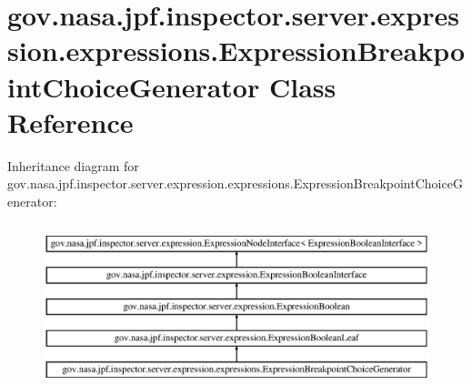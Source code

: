 \hypertarget{classgov_1_1nasa_1_1jpf_1_1inspector_1_1server_1_1expression_1_1expressions_1_1_expression_breakpoint_choice_generator}{}\section{gov.\+nasa.\+jpf.\+inspector.\+server.\+expression.\+expressions.\+Expression\+Breakpoint\+Choice\+Generator Class Reference}
\label{classgov_1_1nasa_1_1jpf_1_1inspector_1_1server_1_1expression_1_1expressions_1_1_expression_breakpoint_choice_generator}
Inheritance diagram for gov.\+nasa.\+jpf.\+inspector.\+server.\+expression.\+expressions.\+Expression\+Breakpoint\+Choice\+Generator\+:\begin{figure}[H]
\begin{center}
\leavevmode
\includegraphics[height=4.827586cm]{classgov_1_1nasa_1_1jpf_1_1inspector_1_1server_1_1expression_1_1expressions_1_1_expression_breakpoint_choice_generator}
\end{center}
\end{figure}
